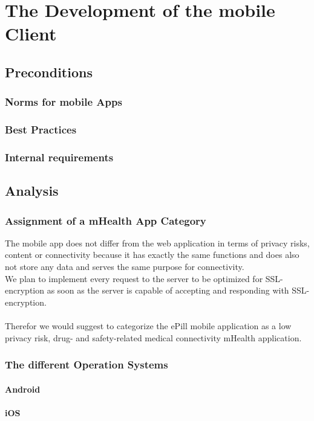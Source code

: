 \section{The Development of the mobile Client}
\subsection{Preconditions}
\subsubsection{Norms for mobile Apps}
\subsubsection{Best Practices}
\subsubsection{Internal requirements}
\subsection{Analysis}
\subsubsection{Assignment of a mHealth App Category}
The mobile app does not differ from the web application in terms of privacy risks, content or connectivity because it has exactly the same functions and does also not store any data and serves the same purpose for connectivity.
\\
We plan to implement every request to the server to be optimized for SSL-encryption as soon as the server is capable of accepting and responding with SSL-encryption. 
\\
\\
Therefor we would suggest to categorize the ePill mobile application as a low privacy risk, drug- and safety-related medical connectivity mHealth application.

\subsubsection{The different Operation Systems}
\paragraph{Android}
\paragraph{iOS}
